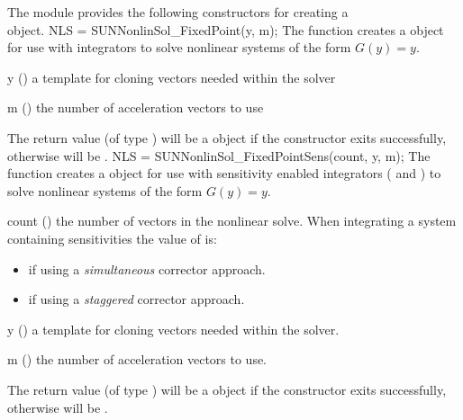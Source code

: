The {\sunnonlinsolfixedpoint} module provides the following constructors
for creating a\\ \noindent
{} object.
{
  NLS = SUNNonlinSol\_FixedPoint(y, m);
}
{
  The function  creates a
   object for use with {\sundials} integrators to
  solve nonlinear systems of the form $G(y) = y$.
}
{
  \begin{args}[y]
  \item[y] ()
    a template for cloning vectors needed within the solver
  \item[m] ()
    the number of acceleration vectors to use
  \end{args}
}
{
  The return value  (of type ) will be
  a {\sunnonlinsol} object if the constructor exits successfully,
  otherwise  will be .
}
{}
{
  NLS = SUNNonlinSol\_FixedPointSens(count, y, m);
}
{
  The function  creates a
   object for use with {\sundials} sensitivity enabled
  integrators ({\cvodes} and {\idas}) to solve nonlinear systems of the form
  $G(y) = y$. 
}
{
  \begin{args}[count]
  \item[count] ()
    the number of vectors in the nonlinear solve. When integrating a system
    containing  sensitivities the value of  is:
    \begin{itemize}
      \item {} if using a \textit{simultaneous} corrector approach.
      \item {} if using a \textit{staggered} corrector approach.
    \end{itemize}
  \item[y] ()
    a template for cloning vectors needed within the solver.
  \item[m] ()
    the number of acceleration vectors to use.
  \end{args}
}
{
  The return value  (of type ) will be
  a {\sunnonlinsol} object if the constructor exits successfully,
  otherwise  will be .
}
{}
